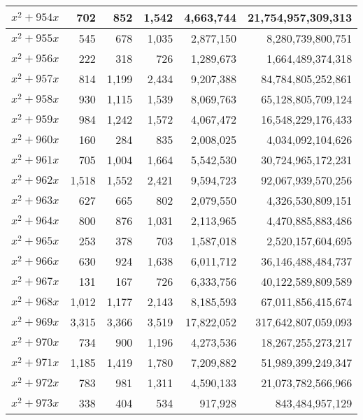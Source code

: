 \documentclass[a4paper]{amsproc}
\theoremstyle{plain}
\theoremstyle{named}
\begin{document}
\begin{longtable}{ | l | r | r | r | r | r | }
$x^2 + 954x$ & 702 & 852 & 1{,}542 & 4{,}663{,}744 & 21{,}754{,}957{,}309{,}313 \\ \hline
$x^2 + 955x$ & 545 & 678 & 1{,}035 & 2{,}877{,}150 & 8{,}280{,}739{,}800{,}751 \\ \hline
$x^2 + 956x$ & 222 & 318 & 726 & 1{,}289{,}673 & 1{,}664{,}489{,}374{,}318 \\ \hline
$x^2 + 957x$ & 814 & 1{,}199 & 2{,}434 & 9{,}207{,}388 & 84{,}784{,}805{,}252{,}861 \\ \hline
$x^2 + 958x$ & 930 & 1{,}115 & 1{,}539 & 8{,}069{,}763 & 65{,}128{,}805{,}709{,}124 \\ \hline
$x^2 + 959x$ & 984 & 1{,}242 & 1{,}572 & 4{,}067{,}472 & 16{,}548{,}229{,}176{,}433 \\ \hline
$x^2 + 960x$ & 160 & 284 & 835 & 2{,}008{,}025 & 4{,}034{,}092{,}104{,}626 \\ \hline
$x^2 + 961x$ & 705 & 1{,}004 & 1{,}664 & 5{,}542{,}530 & 30{,}724{,}965{,}172{,}231 \\ \hline
$x^2 + 962x$ & 1{,}518 & 1{,}552 & 2{,}421 & 9{,}594{,}723 & 92{,}067{,}939{,}570{,}256 \\ \hline
$x^2 + 963x$ & 627 & 665 & 802 & 2{,}079{,}550 & 4{,}326{,}530{,}809{,}151 \\ \hline
$x^2 + 964x$ & 800 & 876 & 1{,}031 & 2{,}113{,}965 & 4{,}470{,}885{,}883{,}486 \\ \hline
$x^2 + 965x$ & 253 & 378 & 703 & 1{,}587{,}018 & 2{,}520{,}157{,}604{,}695 \\ \hline
$x^2 + 966x$ & 630 & 924 & 1{,}638 & 6{,}011{,}712 & 36{,}146{,}488{,}484{,}737 \\ \hline
$x^2 + 967x$ & 131 & 167 & 726 & 6{,}333{,}756 & 40{,}122{,}589{,}809{,}589 \\ \hline
$x^2 + 968x$ & 1{,}012 & 1{,}177 & 2{,}143 & 8{,}185{,}593 & 67{,}011{,}856{,}415{,}674 \\ \hline
$x^2 + 969x$ & 3{,}315 & 3{,}366 & 3{,}519 & 17{,}822{,}052 & 317{,}642{,}807{,}059{,}093 \\ \hline
$x^2 + 970x$ & 734 & 900 & 1{,}196 & 4{,}273{,}536 & 18{,}267{,}255{,}273{,}217 \\ \hline
$x^2 + 971x$ & 1{,}185 & 1{,}419 & 1{,}780 & 7{,}209{,}882 & 51{,}989{,}399{,}249{,}347 \\ \hline
$x^2 + 972x$ & 783 & 981 & 1{,}311 & 4{,}590{,}133 & 21{,}073{,}782{,}566{,}966 \\ \hline
$x^2 + 973x$ & 338 & 404 & 534 & 917{,}928 & 843{,}484{,}957{,}129 \\ \hline

\end{longtable}
\end{document}
